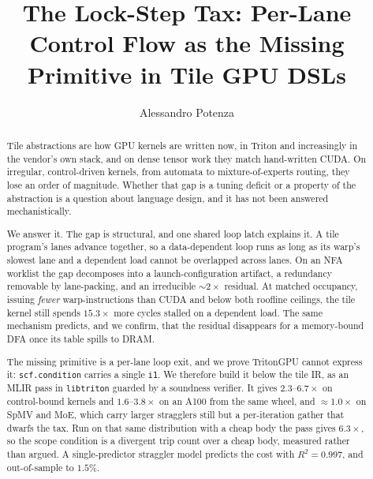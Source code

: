 \documentclass[sigplan,review,nonacm,10pt]{acmart}
\begin{document}
\title{The Lock-Step Tax: Per-Lane Control Flow as the Missing Primitive in Tile GPU DSLs}
\author{Alessandro Potenza}
\renewcommand{\shortauthors}{Potenza}

\begin{abstract}
Tile abstractions are how GPU kernels are written now, in Triton and increasingly in the
vendor's own stack, and on dense tensor work they match hand-written CUDA. On irregular,
control-driven kernels, from automata to mixture-of-experts routing, they lose an order of
magnitude. Whether that gap is a tuning
deficit or a property of the abstraction is a question about language design, and it has
not been answered mechanistically.

We answer it. The gap is structural, and one shared loop latch explains it. A tile
program's lanes advance together, so a data-dependent loop runs as long as its warp's
slowest lane and a dependent load cannot be overlapped across lanes. On an NFA worklist
the gap decomposes into a launch-configuration artifact, a redundancy removable by
lane-packing, and an irreducible ${\sim}2\times$ residual. At matched occupancy, issuing
\emph{fewer} warp-instructions than CUDA and below both roofline ceilings, the tile kernel
still spends $15.3\times$ more cycles stalled on a dependent load. The same mechanism
predicts, and we confirm, that the residual disappears for a memory-bound DFA once its
table spills to DRAM.

The missing primitive is a per-lane loop exit, and we prove TritonGPU cannot express it:
\texttt{scf.condition} carries a single \texttt{i1}. We therefore build it below the tile
IR, as an MLIR pass in \texttt{libtriton} guarded by a soundness verifier. It gives
$2.3$--$6.7\times$ on control-bound kernels and $1.6$--$3.8\times$ on an A100 from the same
wheel, and ${\approx}1.0\times$ on SpMV and MoE, which carry larger stragglers still but a
per-iteration gather that dwarfs the tax. Run on that same distribution with a cheap body
the pass gives $6.3\times$, so the scope condition is a divergent trip count over a cheap
body, measured rather than argued. A single-predictor straggler model predicts the cost with $R^2=0.997$, and
out-of-sample to $1.5\%$.
\end{abstract}
\end{document}
